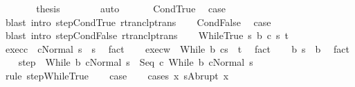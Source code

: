 \begin{isabellebody}
\ \ \ \ \isamarkupfalse%
\ \isamarkupfalse%
\ {\isacharquery}thesis\isanewline
\ \ \ \ \ \ \isamarkupfalse%
\ auto\isanewline
\ \ \isamarkupfalse%
\isanewline
{}\isamarkupfalse%
\isanewline
\ \ \isamarkupfalse%
\ CondTrue\ \isamarkupfalse%
\ {\isacharquery}case\ \isamarkupfalse%
\ {\isacharparenleft}blast\ intro{\isacharcolon}\ step{\isachardot}CondTrue\ rtranclp{\isacharunderscore}trans{\isacharparenright}\isanewline
{}\isamarkupfalse%
\isanewline
\ \ \isamarkupfalse%
\ CondFalse\ \isamarkupfalse%
\ {\isacharquery}case\ \isamarkupfalse%
\ {\isacharparenleft}blast\ intro{\isacharcolon}\ step{\isachardot}CondFalse\ rtranclp{\isacharunderscore}trans{\isacharparenright}\isanewline
{}\isamarkupfalse%
\isanewline
\ \ \isamarkupfalse%
\ {\isacharparenleft}WhileTrue\ s\ b\ c\ s{\isacharprime}\ t{\isacharparenright}\ \isanewline
\ \ \isamarkupfalse%
\ exec{\isacharunderscore}c{\isacharcolon}\ {\isachardoublequoteopen}{\isasymGamma}{\isasymturnstile}\ {\isasymlangle}c{\isacharcomma}Normal\ s{\isasymrangle}\ {\isasymRightarrow}\ s{\isacharprime}{\isachardoublequoteclose}\ \isamarkupfalse%
\ fact\isanewline
\ \ \isamarkupfalse%
\ exec{\isacharunderscore}w{\isacharcolon}\ {\isachardoublequoteopen}{\isasymGamma}{\isasymturnstile}\ {\isasymlangle}While\ b\ c{\isacharcomma}s{\isacharprime}{\isasymrangle}\ {\isasymRightarrow}\ t{\isachardoublequoteclose}\ \isamarkupfalse%
\ fact\isanewline
\ \ \isamarkupfalse%
\ b{\isacharcolon}\ {\isachardoublequoteopen}s\ {\isasymin}\ b{\isachardoublequoteclose}\ \isamarkupfalse%
\ fact\isanewline
\ \ \isamarkupfalse%
\ step{\isacharcolon}\ {\isachardoublequoteopen}{\isasymGamma}{\isasymturnstile}\ {\isacharparenleft}While\ b\ c{\isacharcomma}Normal\ s{\isacharparenright}\ {\isasymrightarrow}\ {\isacharparenleft}Seq\ c\ {\isacharparenleft}While\ b\ c{\isacharparenright}{\isacharcomma}Normal\ s{\isacharparenright}{\isachardoublequoteclose}\isanewline
\ \ \ \ \isamarkupfalse%
\ {\isacharparenleft}rule\ step{\isachardot}WhileTrue{\isacharparenright}\isanewline
\ \ \isamarkupfalse%
\ {\isacharquery}case\isanewline
\ \ \isamarkupfalse%
\ {\isacharparenleft}cases\ {\isachardoublequoteopen}{\isasymexists}x{\isachardot}\ s{\isacharprime}{\isacharequal}Abrupt\ x{\isachardoublequoteclose}{\isacharparenright}\isanewline

\end{isabellebody}
